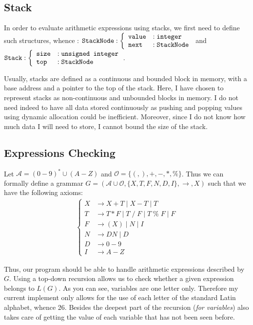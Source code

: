 \documentclass[a4paper,11pt,titlepage]{article}
\begin{document}
\subsection{Stack}
In order to evaluate arithmetic expressions using stacks, we first need to define such structures, whence : $\verb|StackNode| : \left\{\begin{array}{ll}
    \verb|value| &:\verb|integer|\\
    \verb|next| &:\verb|StackNode|
\end{array}\right.$ and $\verb|Stack| : \left\{\begin{array}{ll}
    \verb|size| &:\verb|unsigned integer|\\
    \verb|top| &:\verb|StackNode|
\end{array}\right.$. 

Usually, stacks are defined as a continuous and bounded block in memory, with a base address and a pointer to the top of the stack. Here, I have chosen to represent stacks as non-continuous and unbounded blocks in memory. I do not need indeed to have all data stored continuously as pushing and popping values using dynamic allocation could be inefficient. Moreover, since I do not know how much data I will need to store, I cannot bound the size of the stack.
\pagebreak
\subsection{Expressions Checking}

Let $\mathcal{A}=(0-9)^*\cup(A-Z)$ and $\mathcal{O}=\{(,),+,-,*,\%\}$. Thus we can formally define a grammar $G=(\mathcal{A}\cup\mathcal{O},\{X,T,F,N,D,I\},\to,X)$ such that we have the following axioms: \begin{align*}\left\{\begin{array}{ll}
    X &\to X+T\;|\;X-T\;|\;T\\
    T &\to T*F\;|\;T\;/\;F\;|\;T\;\%\;F\;|\;F\\
    F &\to (X)\;|\;N\;|\;I\\
    N &\to DN\;|\;D\\
    D &\to 0-9\\
    I &\to A-Z
\end{array}\right.\end{align*}

Thus, our program should be able to handle arithmetic expressions described by $G$. Using a top-down recursion allows us to check whether a given expression belongs to $L(G)$. As you can see, variables are one letter only. Therefore my current implement only allows for the use of each letter of the standard Latin alphabet, whence 26. Besides the deepest part of the recursion (\textit{for variables}) also takes care of getting the value of each variable that has not been seen before.
\end{document}

